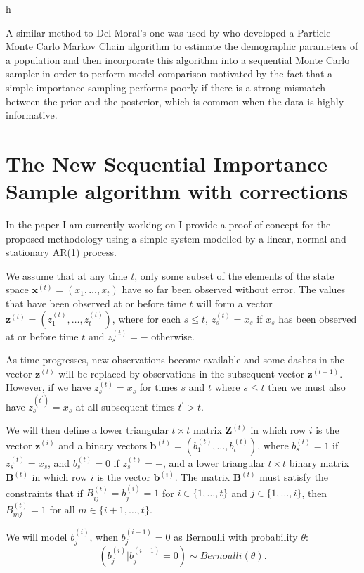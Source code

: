 h\documentclass[11pt,a4paper]{article}
\renewcommand{\vec}[1]{\mathbf{#1}}
\begin{document}
A similar method to Del Moral's one was used by \cite{Finke} who developed a Particle Monte Carlo Markov Chain algorithm to estimate the demographic parameters of a population and then incorporate this algorithm into a sequential Monte Carlo sampler in order to perform model comparison motivated by the fact that a simple importance sampling performs poorly if there is a strong mismatch between the prior and the posterior, which is common when the data is highly informative.

\section{The New Sequential Importance Sample algorithm with corrections}

In the paper I am currently working on I provide a proof of concept for the proposed methodology using a simple system modelled by a linear, normal and stationary AR(1) process.

We assume that at any time $t$, only some subset of the elements of the state space $\vec {x}^{(t)} = (x_1, \dots, x_{t})$ have so far been observed without error. The values that have been observed at or before time $t$ will form a vector $\vec{z}^{(t)} = (z_1^{(t)}, \dots, z_{t}^{(t)})$, where for each $s \leq t$, $z_s^{(t)} = x_s$ if $x_s$ has been observed at or before time $t$ and $z_s^{(t)} = -$ otherwise.

As time progresses, new observations become available and some dashes in the vector $\vec{z}^{(t)}$ will be replaced by observations in the subsequent vector $\vec{z}^{(t+1)}$. However, if we have $z_s^{(t)} = x_s$ for times $s$ and $t$ where $s \leq t$ then we must also have $z_s^{(t^{\prime})} = x_s$ at all subsequent times $t^{\prime} > t$.

We will then define a lower triangular $t \times t$ matrix $\vec{Z}^{(t)}$ in which row $i$ is the vector $\vec{z}^{(i)}$ and a binary vectors $\vec{b}^{(t)} = (b_1^{(t)}, \dots, b_{t}^{(t)})$, where $b_s^{(t)} = 1$ if $z_s^{(t)} = x_s$, and $b_s^{(t)} = 0$ if $z_s^{(t)} = -$, and a lower triangular $t \times t$ binary matrix $\vec{B}^{(t)}$ in which row $i$ is the vector $\vec{b}^{(i)}$.
The matrix $\vec{B}^{(t)}$ must satisfy the constraints that if $B_{ij}^{(t)} = b_j^{(i)} = 1$ for $i \in \{ 1, \ldots, t \}$ and $j \in \{ 1, \ldots, i \}$, then $B_{mj}^{(t)} = 1$ for all $m \in \{ i+1, \ldots, t \}$.

We will model $b_j^{(i)}$, when $b_j^{(i-1)} = 0$ as Bernoulli with probability $\theta$:
\[
(b_j^{(i)} | b_j^{(i-1)} = 0) \sim Bernoulli(\theta).
\]
\end{document}
